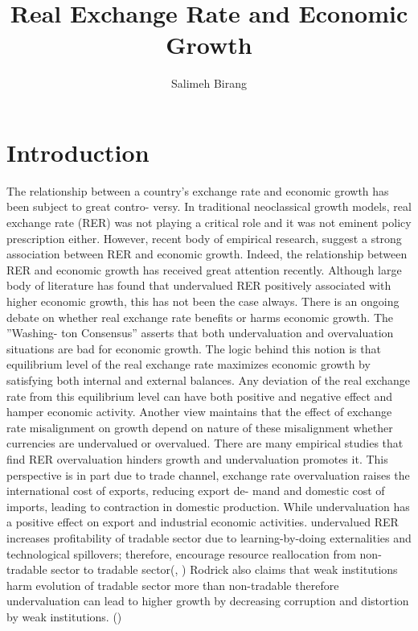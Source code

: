 \documentclass{article}
\date{\vspace{-5ex}}
\title{\bf Real Exchange Rate and Economic Growth}
\author{Salimeh Birang}
\begin{document}
\maketitle
\thispagestyle{empty}

\section{Introduction}
The relationship between a country’s exchange rate and economic growth has been subject to great contro- versy. In traditional neoclassical growth models, real exchange rate (RER) was not playing a critical role and it was not eminent policy prescription either. However, recent body of empirical research, suggest a strong association between RER and economic growth. Indeed, the relationship between RER and economic growth has received great attention recently. Although large body of literature has found that undervalued RER positively associated with higher economic growth, this has not been the case always.
There is an ongoing debate on whether real exchange rate benefits or harms economic growth. The ”Washing- ton Consensus” asserts that both undervaluation and overvaluation situations are bad for economic growth. The logic behind this notion is that equilibrium level of the real exchange rate maximizes economic growth by satisfying both internal and external balances. Any deviation of the real exchange rate from this equilibrium level can have both positive and negative effect and hamper economic activity.
Another view maintains that the effect of exchange rate misalignment on growth depend on nature of these misalignment whether currencies are undervalued or overvalued. There are many empirical studies that find RER overvaluation hinders growth and undervaluation promotes it. This perspective is in part due to trade channel, exchange rate overvaluation raises the international cost of exports, reducing export de- mand and domestic cost of imports, leading to contraction in domestic production. While undervaluation has a positive effect on export and industrial economic activities. undervalued RER increases profitability of tradable sector due to learning-by-doing externalities and technological spillovers; therefore, encourage
resource reallocation from non-tradable sector to tradable sector(\cite{rodrik2008real}, \cite{rapetti2012real}) Rodrick also claims that weak institutions harm evolution of tradable sector more than non-tradable therefore undervaluation can lead to higher growth by decreasing corruption and distortion by weak institutions. (\cite{eduardo2013fear})
\end{document}

